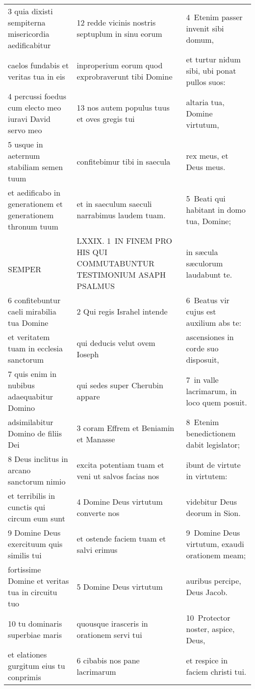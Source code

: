 \documentclass{article}
\begin{document}
\begin{longtable}{@{}p{}p{}p{}@{}}
3 quia dixisti sempiterna misericordia aedificabitur	&	12 redde vicinis nostris septuplum in sinu eorum	&	4 Etenim passer invenit sibi domum,	\\
caelos fundabis et veritas tua in eis	&	inproperium eorum quod exprobraverunt tibi Domine	&	et turtur nidum sibi, ubi ponat pullos suos:	\\
4 percussi foedus cum electo meo iuravi David servo meo	&	13 nos autem populus tuus et oves gregis tui	&	altaria tua, Domine virtutum,	\\
5 usque in aeternum stabiliam semen tuum	&	confitebimur tibi in saecula	&	rex meus, et Deus meus.	\\
et aedificabo in generationem et generationem thronum tuum	&	et in saeculum saeculi narrabimus laudem tuam.	&	5 Beati qui habitant in domo tua, Domine;	\\
    SEMPER	&	LXXIX. 1 IN FINEM PRO HIS QUI COMMUTABUNTUR TESTIMONIUM ASAPH PSALMUS	&	in sæcula sæculorum laudabunt te.	\\
6 confitebuntur caeli mirabilia tua Domine	&	2 Qui regis Israhel intende	&	6 Beatus vir cujus est auxilium abs te:	\\
et veritatem tuam in ecclesia sanctorum	&	qui deducis velut ovem Ioseph	&	ascensiones in corde suo disposuit,	\\
7 quis enim in nubibus adaequabitur Domino	&	qui sedes super Cherubin appare	&	7 in valle lacrimarum, in loco quem posuit.	\\
adsimilabitur Domino de filiis Dei	&	3 coram Effrem et Beniamin et Manasse	&	8 Etenim benedictionem dabit legislator;	\\
8 Deus inclitus in arcano sanctorum nimio	&	excita potentiam tuam et veni ut salvos facias nos	&	ibunt de virtute in virtutem:	\\
et terribilis in cunctis qui circum eum sunt	&	4 Domine Deus virtutum converte nos	&	videbitur Deus deorum in Sion.	\\
9 Domine Deus exercituum quis similis tui	&	et ostende faciem tuam et salvi erimus	&	9 Domine Deus virtutum, exaudi orationem meam;	\\
fortissime Domine et veritas tua in circuitu tuo	&	5 Domine Deus virtutum	&	auribus percipe, Deus Jacob.	\\
10 tu dominaris superbiae maris	&	quousque irasceris in orationem servi tui	&	10 Protector noster, aspice, Deus,	\\
et elationes gurgitum eius tu conprimis	&	6 cibabis nos pane lacrimarum	&	et respice in faciem christi tui.	\\

\end{longtable}
\end{document}
